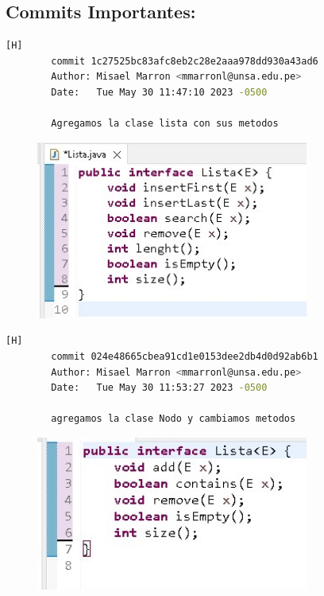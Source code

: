 \documentclass{article}
\begin{document}
	\subsection{Commits Importantes:}
	\begin{lstlisting}[language=bash,caption={Mi primer commit importante es cuando cree la clase lista y le agregue sus metodos de interface , para ser usados luego.}][H]
		commit 1c27525bc83afc8eb2c28e2aaa978dd930a43ad6
		Author: Misael Marron <mmarronl@unsa.edu.pe>
		Date:   Tue May 30 11:47:10 2023 -0500

    	Agregamos la clase lista con sus metodos
	\end{lstlisting}
	
	\begin{figure}[H]
		\centering
		\includegraphics[width=0.8\textwidth,keepaspectratio]{img/codigo1.jpg}
	\end{figure}
	
	
	\begin{lstlisting}[language=bash,caption={Mi segundo commit importante es cuando cambie la clase lista y agregue la clase nodo.}][H]
		commit 024e48665cbea91cd1e0153dee2db4d0d92ab6b1
		Author: Misael Marron <mmarronl@unsa.edu.pe>
		Date:   Tue May 30 11:53:27 2023 -0500

	    agregamos la clase Nodo y cambiamos metodos
	\end{lstlisting}
	
	\begin{figure}[H]
		\centering
		\includegraphics[width=0.8\textwidth,keepaspectratio]{img/codigo2.jpg}	
	\end{figure}
	
\end{document}
